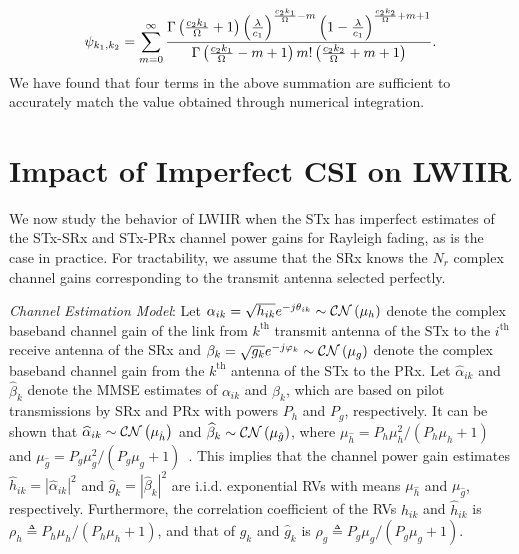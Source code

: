 \documentclass[12pt,draftcls,peerreview,onecolumn]{IEEEtran}
\newcommand{\CN}{{\cal CN}}
\newcommand{\define}{\triangleq}
\newcommand{\lam}{\lambda}
\newcommand{\mug}{{\mu_{g}}}
\newcommand{\muh}{{\mu_{h}}}
\newcommand{\Nr}{{N_r}}
\newcommand{\such}{h}
\newcommand{\puch}{g}
\newcommand{\hk}[1]{{\such_{#1}}}
\newcommand{\gk}[1]{{\puch_{#1}}}
\newcommand{\cone}{c_{1}}
\newcommand{\ctwo}{c_{2}}
\newcommand{\lambym}{\frac{\lam}{\cone}}
\newcommand{\al}{\ctwo}
\newcommand{\snr}{\Omega}
\newcommand{\albysnr}[1][]{\frac{\al#1}{\snr}}
\newcommand{\suchph}{\theta}
\newcommand{\puchph}{\varphi}
\newcommand{\psifun}[2]{\psi_{{#1},{#2}}}
\newcommand{\ith}{i^{\text{th}}}
\newcommand{\kth}{k^{\text{th}}}
\newcommand{\akone}{\albysnr[k_1]}
\newcommand{\sug}{\alpha}
\newcommand{\pug}{\beta}
\newcommand{\sugain}[1]{\sug_{#1}}
\newcommand{\pugain}[1]{\pug_{#1}}
\newcommand{\sugainhat}[1]{\widehat{\sug}_{#1}}
\newcommand{\pugainhat}[1]{\widehat{\pug}_{#1}}
\newcommand{\gpilotpower}{P_g}
\newcommand{\hpilotpower}{P_h}
\newcommand{\hhat}{\hat{\such}}
\newcommand{\ghat}{\hat{\puch}}
\newcommand{\hkhat}[1]{\hhat_{#1}}
\newcommand{\gkhat}[1]{\ghat_{#1}}
\newcommand{\muhhat}{\mu_{\hhat}}
\newcommand{\mughat}{\mu_{\ghat}}
\newcommand{\rhog}{\rho_g}
\newcommand{\rhoh}{\rho_h}
\begin{document}
%
\begin{equation}
\psifun{k_1}{k_2} = \sum_{\midx=0}^{\infty} \frac{\Gamma\left(\akone+1 \right) \left(\lambym\right)^{\albysnr[k_1]  - \midx} \left(1-\lambym\right)^{\albysnr[k_2]+\midx+1}}{\Gamma\left(\akone-\midx+1 \right)\midx ! \left(\albysnr[k_2]+\midx+1\right)}. 
\label{eq:inf_sum}
\end{equation}
We have found that four terms in the above summation are sufficient to accurately match the value obtained through numerical integration. 
%
%





\section{Impact of Imperfect CSI on LWIIR}
\label{sec:imperfectcsi}
We now study the behavior of LWIIR when the STx has imperfect estimates of the STx-SRx and STx-PRx channel power gains for Rayleigh fading, as is the case in practice. For tractability, we assume that the SRx knows the $\Nr$  complex channel gains corresponding to the transmit antenna selected perfectly. %


{\em Channel Estimation Model}: Let $ \sugain{ik}= \sqrt{\hk{ik}}e^{-j\suchph_{ik}}\sim\CN\left(\muh\right) $ denote the complex baseband channel gain of the link from $\kth$ transmit antenna of the STx to the $\ith$ receive antenna of the SRx and $\pugain{k} = \sqrt{\gk{k}}e^{-j\puchph_{k}}\sim\CN\left(\mug\right)$ denote the complex baseband channel gain from the $\kth$ antenna of the STx to the PRx. Let $\sugainhat{ik}$ and $\pugainhat{k}$ denote the MMSE estimates of $\sugain{ik}$ and $\pugain{k}$, which are based on pilot transmissions by SRx and PRx with powers $\hpilotpower$ and $\gpilotpower$, respectively.  It can be shown that  $\sugainhat{ik}\sim\CN\left(\muhhat \right)$ and $\pugainhat{k}\sim \CN\left(\mughat\right)$, where  $\muhhat ={\hpilotpower\mu^2_{\such}}/{\left( \hpilotpower\muh+1\right)}$ and $\mughat = {\gpilotpower\mu^2_{\puch}}/{\left( \gpilotpower\mug+1\right)}$~\cite{Kashyap_2014_TCOM}.  
This implies that the channel power gain estimates $\hkhat{ik}=|\sugainhat{ik}|^2$ and $\gkhat{k}=|\pugainhat{k}|^2$ are i.i.d. exponential RVs with means $\muhhat$ and $\mughat$, respectively. Furthermore, the correlation coefficient  of the RVs $\hk{ik}$ and $\hkhat{ik}$ is $\rhoh\define{\hpilotpower\muh}/{\left( \hpilotpower\muh + 1\right) }$, and that of $\gk{k}$ and $\gkhat{k}$ is $\rhog \define{\gpilotpower\mug}/{\left( \gpilotpower\mug + 1\right) }$. 
\end{document}

